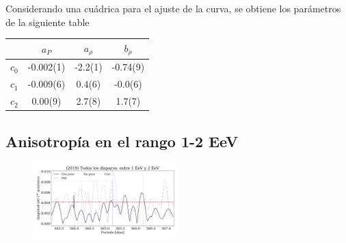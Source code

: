 Considerando una cuádrica para el ajuste de la curva, se obtiene los parámetros de la siguiente table
\begin{table}[H]
\centering
\begin{tabular}{c|c|c|c}
		 	& $a_P$ 	&  $a_\rho$  & $ b_\rho$ \\ \hline
$c_0$ 		& -0.002(1) & 	-2.2(1)	 &	-0.74(9)\\ \hline
$c_1$ 		& -0.009(6)	& 	 0.4(6)	 &	-0.0(6)\\ \hline
$c_2$ 		&  0.00(9) 	& 	 2.7(8)  &	 1.7(7)\\ \hline
\end{tabular}
\end{table}


\subsection{Anisotropía en el rango 1-2 EeV}

\begin{figure}[htbp]
	\centering
	\includegraphics[width=0.5\textwidth]{ani_corr.png}
\end{figure}



